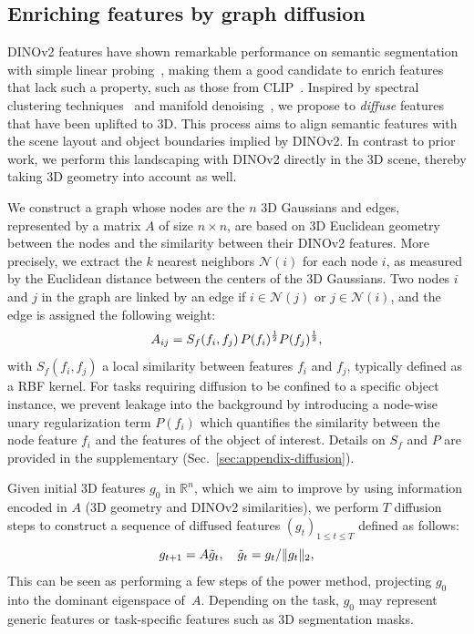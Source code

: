 \subsection{Enriching features by graph diffusion}
\label{sec:diffusion}
DINOv2 features have shown remarkable performance on semantic segmentation with simple linear probing~\citep{oquab2024dinov2}, making them 
a good candidate to enrich features that lack such a property, such as those from CLIP~\citep{wysoczanska2023clipdino,zuo2024fmgs,liu2023weakly}. 
Inspired by spectral clustering techniques~\citep{shi2000normalized,kondor2002diffusion,belkin2001laplacian} and manifold denoising~\citep{hein2006manifold}, 
we propose to \textit{diffuse} features that have been uplifted to 3D. This process aims to align semantic features with the scene layout and object boundaries implied by DINOv2.
In contrast to prior work, we perform this landscaping with DINOv2 directly in the 3D scene, thereby taking 3D geometry into account as well.

We construct a graph whose nodes are the $n$ 3D Gaussians and edges, represented by a matrix $A$ of size $n\times n$, are based on 3D Euclidean geometry between the nodes and the similarity between their DINOv2 features. More precisely, we extract the $k$ nearest neighbors $\mathcal{N}(i)$ for each node $i$, as measured by the Euclidean distance between the centers of the 3D Gaussians. 
Two nodes $i$ and $j$ in the graph are linked by an edge if $i \in \mathcal{N}(j)$ or $j \in \mathcal{N}(i)$, and the edge is assigned the following weight:
\vspace{-.07cm}
\begin{equation}
\label{eq:edges}
A_{ij} = S_f(f_i, f_j) \, P(f_i)^{\frac 12}P(f_j)^{\frac 12}, 
\vspace{-.07cm}
\end{equation}
with $S_f(f_i,f_j)$ a local similarity between features $f_i$ and $f_j$, typically defined as a RBF kernel. For tasks requiring diffusion to be confined to a specific object instance, we prevent leakage into the background by introducing a node-wise unary regularization term $P(f_i)$ which quantifies the similarity between the node feature $f_i$ and the features of the object of interest. Details on $S_f$ and $P$ are provided in the supplementary (Sec.~\ref{sec:appendix-diffusion}).

Given initial 3D features $g_0$ in $\mathbb{R}^n$, which we aim to improve by using information encoded in $A$ (3D geometry and DINOv2 similarities), we perform $T$ diffusion steps to construct a sequence of diffused features $(g_t)_{1\leq t \leq T}$  defined as follows:
\vspace{-.07cm}
\begin{equation}
g_{t+1} = A\tilde{g}_{t}, \quad \tilde{g}_{t} = {g_t}/{\|g_t\|_2},
\label{eq:diffusion}
\vspace{-.07cm}
\end{equation}
This can be seen as performing a few steps of the power method, projecting $g_0$ into the dominant eigenspace of~$A$. Depending on the task, $g_0$ may represent generic features or task-specific features such as 3D segmentation masks.
\vspace{-.05cm}